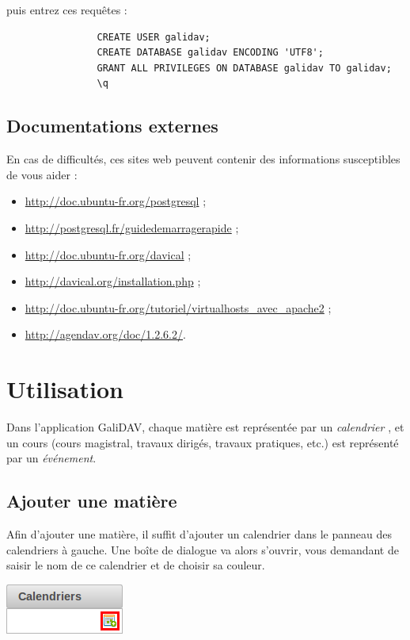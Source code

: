 \documentclass[a4paper, 11pt]{report}
\begin{document}
			puis entrez ces requêtes :
			\begin{verbatim}
				CREATE USER galidav;
				CREATE DATABASE galidav ENCODING 'UTF8';
				GRANT ALL PRIVILEGES ON DATABASE galidav TO galidav;
				\q
			\end{verbatim}
		\section{Documentations externes}
			En cas de difficultés, ces sites web peuvent contenir des informations susceptibles de vous aider :
			\begin{itemize}
				\item \url{http://doc.ubuntu-fr.org/postgresql} ;
				\item \url{http://postgresql.fr/guidedemarragerapide} ;
				\item \url{http://doc.ubuntu-fr.org/davical} ;
				\item \url{http://davical.org/installation.php} ;
				\item \url{http://doc.ubuntu-fr.org/tutoriel/virtualhosts_avec_apache2} ;
				\item \url{http://agendav.org/doc/1.2.6.2/}.
			\end{itemize}

	\chapter{Utilisation}
		Dans l’application GaliDAV, chaque matière est représentée par un \emph{calendrier} , et un cours (cours magistral, travaux dirigés, travaux pratiques, etc.) est représenté par un \emph{événement}.
		\section{Ajouter une matière}
			Afin d’ajouter une matière, il suffit d’ajouter un calendrier dans le panneau des calendriers à gauche. Une boîte de dialogue va alors s’ouvrir, vous demandant de saisir le nom de ce calendrier et de choisir sa couleur.

			\begin{center}
				\includegraphics[scale = 1]{ajouter_calendrier.png}
			\end{center}
\end{document}
